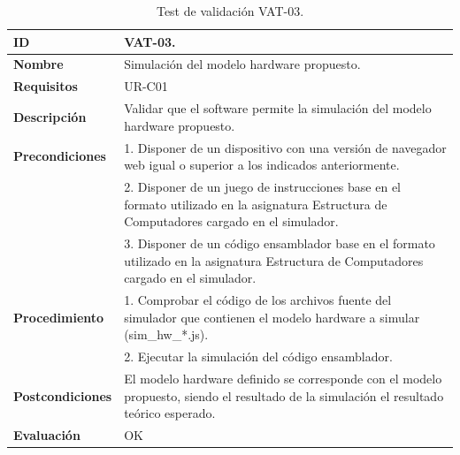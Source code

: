 \begin{center}
\begin{table}[htbp]
\centering
\caption{Test de validación VAT-03.}
\begin{tabular}{@{}p{2.5cm} p{13cm}@{}} 
\toprule
\textbf{ID} 					& VAT-03. \\
\midrule
\textbf{Nombre} 				& Simulación del modelo \gls{hardware} propuesto. \\
\midrule
\textbf{Requisitos} 		& UR-C01 \\
\midrule
\textbf{Descripción} 		& Validar que el \gls{software} permite la simulación del modelo \gls{hardware} propuesto. \\
\midrule
\textbf{Precondiciones}		& 1. Disponer de un dispositivo con una versión de navegador web igual o superior a los indicados anteriormente. \\
											& 2. Disponer de un juego de instrucciones base en el formato utilizado en la asignatura Estructura de Computadores cargado en el simulador. \\
											& 3. Disponer de un código \gls{ensamblador} base en el formato utilizado en la asignatura Estructura de Computadores cargado en el simulador. \\
\midrule
\textbf{Procedimiento}		& 1. Comprobar el código de los archivos fuente del simulador que contienen el modelo \gls{hardware} a simular (sim\_hw\_*.js).\\
											& 2. Ejecutar la simulación del código \gls{ensamblador}.\\
\midrule
\textbf{Postcondiciones} 		&  El modelo \gls{hardware} definido se corresponde con el modelo propuesto, siendo el resultado de la simulación el resultado teórico esperado.\\
\midrule
\textbf{Evaluación} 			& OK \\
\bottomrule
\end{tabular}
\label{tab:vat-03}
\end{table}
\end{center}

